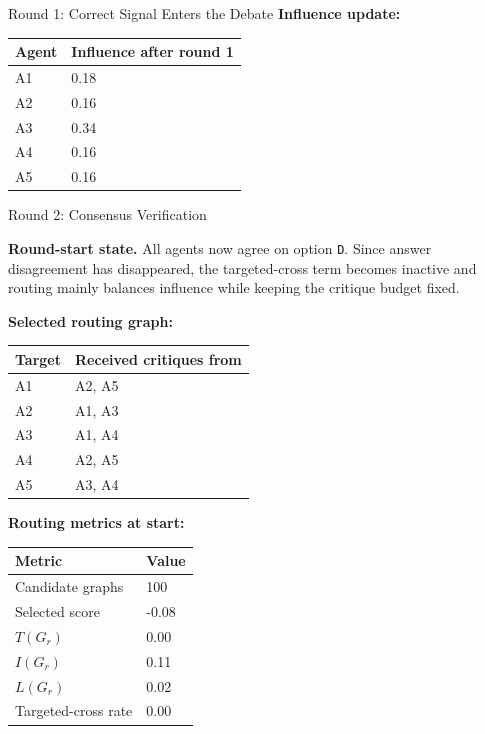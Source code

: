 \begin{roundbox}{Round 1: Correct Signal Enters the Debate}
\textbf{Influence update:}
\begin{center}
\footnotesize
\begin{tabular}{@{}ll@{}}
\toprule
Agent & Influence after round 1 \\
\midrule
A1 & 0.18 \\
A2 & 0.16 \\
A3 & 0.34 \\
A4 & 0.16 \\
A5 & 0.16 \\
\bottomrule
\end{tabular}
\end{center}

\end{roundbox}

\begin{roundbox}{Round 2: Consensus Verification}

\textbf{Round-start state.} All agents now agree on option \texttt{D}. Since answer disagreement has disappeared, the targeted-cross term becomes inactive and routing mainly balances influence while keeping the critique budget fixed.

\vspace{1mm}
\textbf{Selected routing graph:}
\begin{center}
\footnotesize
\begin{tabular}{@{}ll@{}}
\toprule
Target & Received critiques from \\
\midrule
A1 & A2, A5 \\
A2 & A1, A3 \\
A3 & A1, A4 \\
A4 & A2, A5 \\
A5 & A3, A4 \\
\bottomrule
\end{tabular}
\end{center}

\textbf{Routing metrics at start:}
\begin{center}
\footnotesize
\begin{tabular}{@{}ll@{}}
\toprule
Metric & Value \\
\midrule
Candidate graphs & 100 \\
Selected score & -0.08 \\
$T(G_r)$ & 0.00 \\
$I(G_r)$ & 0.11 \\
$L(G_r)$ & 0.02 \\
Targeted-cross rate & 0.00 \\
\bottomrule
\end{tabular}
\end{center}


\end{roundbox}
